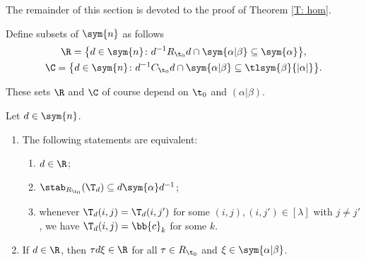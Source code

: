 The remainder of this section is devoted to the proof of Theorem \ref{T: hom}.

\begin{Definition}\label{D:RC}
Define subsets of $\sym{n}$ as follows
\begin{gather*}
\R = \big\{ d \in \sym{n}\colon d^{-1} R_{\t_0}d \cap \sym{\alpha|\beta} \subseteq \sym{\alpha} \big\}, \\
\C = \big\{ d \in \sym{n}\colon d^{-1} C_{\t_0}d \cap \sym{\alpha|\beta} \subseteq \tlsym{\beta}{|\alpha|} \big\}.
\end{gather*}
\end{Definition}

These sets $\R$ and $\C$ of course depend on $\t_0$ and $(\alpha|\beta)$.

\begin{Lemma} \label{L:R}
Let $d \in \sym{n}$.
\begin{enumerate}\itemsep=0pt
\item[$(i)$] The following statements are equivalent:
\begin{enumerate}\itemsep=0pt
\item [$(a)$] $d \in \R$;
\item [$(b)$] $\stab_{R_{\t_0}} (\T_d) \subseteq d\sym{\alpha}d^{-1}$;
\item [$(c)$] whenever $\T_d(i,j) = \T_d(i,j')$ for some $(i,j),(i,j') \in [\lambda]$ with $j \ne j'$, we have $\T_d(i,j) = \bb{c}_k$ for some $k$.
\end{enumerate}
\item[$(ii)$] If $d \in \R$, then $\tau d \xi \in \R$ for all $\tau \in R_{\t_0}$ and $\xi \in \sym{\alpha|\beta}$.
\end{enumerate}
\end{Lemma}

